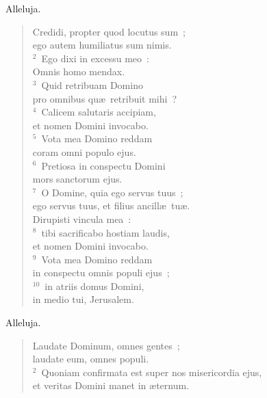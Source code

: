\bchapter
\lettrine[lines=3,image=true,loversize=0.05,lraise=-0.03]{A}{}lleluja. \begin{flushleft}\begin{verse}\vspace{6pt}Credidi, propter quod locutus sum~;\\ ego autem humiliatus sum nimis.\\
${}^{2}$~Ego dixi in excessu meo~:\\ Omnis homo mendax.\\
${}^{3}$~Quid retribuam Domino\\ pro omnibus qu\ae\ retribuit mihi~?\\
${}^{4}$~Calicem salutaris accipiam,\\ et nomen Domini invocabo.\\
${}^{5}$~Vota mea Domino reddam\\ coram omni populo ejus.\\
${}^{6}$~Pretiosa in conspectu Domini\\ mors sanctorum ejus.\\
${}^{7}$~O Domine, quia ego servus tuus~;\\ ego servus tuus, et filius ancill\ae\ tu\ae .\\ Dirupisti vincula mea~:\\
${}^{8}$~tibi sacrificabo hostiam laudis,\\ et nomen Domini invocabo.\\
${}^{9}$~Vota mea Domino reddam\\ in conspectu omnis populi ejus~;\\
${}^{10}$~in atriis domus Domini,\\ in medio tui, Jerusalem.\end{verse}\end{flushleft}



\bchapter
\lettrine[lines=3,image=true,loversize=0.05,lraise=-0.03]{A}{}lleluja. \begin{flushleft}\begin{verse}\vspace{6pt}Laudate Dominum, omnes gentes~;\\ laudate eum, omnes populi.\\
${}^{2}$~Quoniam confirmata est super nos misericordia ejus,\\ et veritas Domini manet in \ae ternum.\end{verse}\end{flushleft}



